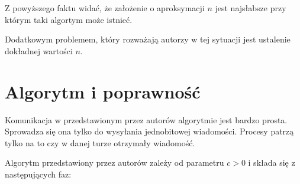 \documentclass[11pt,a4paper]{article}
\begin{document}
Z powyższego faktu widać, że założenie o aproksymacji $n$ jest najsłabsze przy którym taki algortym może istnieć. 

Dodatkowym problemem, który rozważają autorzy w tej sytuacji jest ustalenie dokładnej wartości $n$.

\section{Algorytm i poprawność}

Komunikacja w przedstawionym przez autorów algorytmie jest bardzo prosta. Sprowadza się ona tylko do wysyłania jednobitowej wiadomości. 
Procesy patrzą tylko na to czy w danej turze otrzymały wiadomość. 

Algorytm przedstawiony przez autorów zależy od parametru $c > 0$ i składa się z następujących faz:
\end{document}
